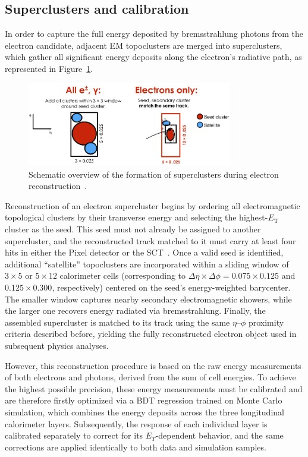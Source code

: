 \subsection{Superclusters and calibration}
In order to capture the full energy deposited by bremsstrahlung photons from the electron candidate, adjacent EM topoclusters are merged into superclusters, which gather all significant energy deposits along the electron’s radiative path, as represented in Figure~\ref{fig:superclust}.  
\begin{figure}[htbp]
  \centering
  \includegraphics[width=0.8\textwidth]{images/superclusters.png}
  \caption{Schematic overview of the formation of superclusters during electron reconstruction~\cite{Aad:2684552}.}
  \label{fig:superclust}
\end{figure}
Reconstruction of an electron supercluster begins by ordering all electromagnetic topological clusters by their transverse energy and selecting the highest-$E_{\text{T}}$ cluster as the seed. This seed must not already be assigned to another supercluster, and the reconstructed track matched to it must carry at least four hits in either the Pixel detector or the SCT~\cite{Aad:2684552}. Once a valid seed is identified, additional “satellite” topoclusters are incorporated within a sliding window of \(3\times5\) or \(5\times12\) calorimeter cells (corresponding to \(\Delta\eta\times\Delta\phi = 0.075\times0.125\) and \(0.125\times0.300\), respectively) centered on the seed’s energy-weighted barycenter. The smaller window captures nearby secondary electromagnetic showers, while the larger one recovers energy radiated via bremsstrahlung. Finally, the assembled supercluster is matched to its track using the same \(\eta\)–\(\phi\) proximity criteria described before, yielding the fully reconstructed electron object used in subsequent physics analyses.  

However, this reconstruction procedure is based on the raw energy measurements of both electrons and photons, derived from the sum of cell energies. To achieve the highest possible precision, these energy measurements must be calibrated and are therefore firstly optimized via a BDT regression trained on Monte Carlo simulation, which combines the energy deposits across the three longitudinal calorimeter layers. Subsequently, the response of each individual layer is calibrated separately to correct for its \(E_T\)-dependent behavior, and the same corrections are applied identically to both data and simulation samples.

